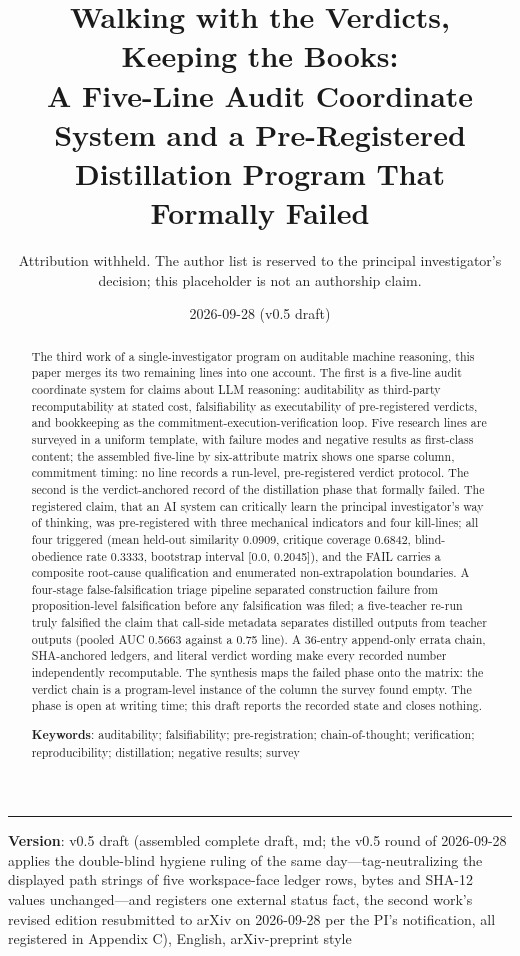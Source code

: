\documentclass[11pt]{article}
\title{\bfseries Walking with the Verdicts, Keeping the Books:\\ A Five-Line Audit Coordinate System and a Pre-Registered\\ Distillation Program That Formally Failed}
\author{Attribution withheld. The author list is reserved to the principal investigator's decision; this placeholder is not an authorship claim.}
\date{2026-09-28 (v0.5 draft)}
\begin{document}
\maketitle
\thispagestyle{empty}

\begin{abstract}
The third work of a single-investigator program on auditable machine reasoning, this paper merges its two remaining lines into one account. The first is a five-line audit coordinate system for claims about LLM reasoning: auditability as third-party recomputability at stated cost, falsifiability as executability of pre-registered verdicts, and bookkeeping as the commitment-execution-verification loop. Five research lines are surveyed in a uniform template, with failure modes and negative results as first-class content; the assembled five-line by six-attribute matrix shows one sparse column, commitment timing: no line records a run-level, pre-registered verdict protocol. The second is the verdict-anchored record of the distillation phase that formally failed. The registered claim, that an AI system can critically learn the principal investigator's way of thinking, was pre-registered with three mechanical indicators and four kill-lines; all four triggered (mean held-out similarity 0.0909, critique coverage 0.6842, blind-obedience rate 0.3333, bootstrap interval [0.0, 0.2045]), and the FAIL carries a composite root-cause qualification and enumerated non-extrapolation boundaries. A four-stage false-falsification triage pipeline separated construction failure from proposition-level falsification before any falsification was filed; a five-teacher re-run truly falsified the claim that call-side metadata separates distilled outputs from teacher outputs (pooled AUC 0.5663 against a 0.75 line). A 36-entry append-only errata chain, SHA-anchored ledgers, and literal verdict wording make every recorded number independently recomputable. The synthesis maps the failed phase onto the matrix: the verdict chain is a program-level instance of the column the survey found empty. The phase is open at writing time; this draft reports the recorded state and closes nothing.

\medskip\noindent\textbf{Keywords}: auditability; falsifiability; pre-registration; chain-of-thought; verification; reproducibility; distillation; negative results; survey
\end{abstract}
\vspace{0.5em}\hrule\vspace{0.8em}
\noindent \textbf{Version}: v0.5 draft (assembled complete draft, md; the v0.5 round of 2026-09-28 applies the double-blind hygiene ruling of the same day—tag-neutralizing the displayed path strings of five workspace-face ledger rows, bytes and SHA-12 values unchanged—and registers one external status fact, the second work's revised edition resubmitted to arXiv on 2026-09-28 per the PI's notification, all registered in Appendix C), English, arXiv-preprint style\par\smallskip
\end{document}
